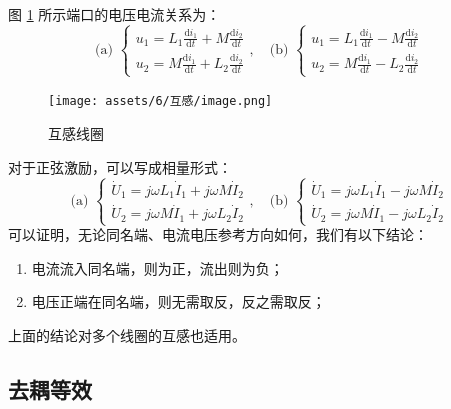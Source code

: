 \documentclass[UTF8]{report}
\theoremstyle{MyLineTheoremStyle} %
\theoremstyle{MyBlockTheoremStyle} %
\theoremstyle{MySubsubsectionStyle} %
\begin{document}
图 \ref{互感线圈} 所示端口的电压电流关系为：
\begin{equation}
\text{(a)\ } 
\begin{cases}
u_1 = L_1 \frac{\mathrm{d} i_1}{\mathrm{d} t} + M \frac{\mathrm{d} i_2}{\mathrm{d} t} \\
u_2 = M \frac{\mathrm{d} i_1}{\mathrm{d} t} + L_2 \frac{\mathrm{d} i_2}{\mathrm{d} t}
\end{cases}
,\quad 
\text{(b)\ }
\begin{cases}
u_1 = L_1 \frac{\mathrm{d} i_1}{\mathrm{d} t} - M \frac{\mathrm{d} i_2}{\mathrm{d} t} \\
u_2 = M \frac{\mathrm{d} i_1}{\mathrm{d} t} - L_2 \frac{\mathrm{d} i_2}{\mathrm{d} t}
\end{cases}
\end{equation}
\begin{figure}[H]\centering
    \texttt{[image: assets/6/互感/image.png]}
    \caption{互感线圈}
    \label{互感线圈}
\end{figure}
对于正弦激励，可以写成相量形式：
\begin{equation}
\text{(a)\ }
\begin{cases}
\dot{U}_1 = j \omega L_1 \dot{I}_1 + j \omega M \dot{I}_2 \\
\dot{U}_2 = j \omega M \dot{I}_1 + j \omega L_2 \dot{I}_2
\end{cases}
,\quad
\text{(b)\ }
\begin{cases}
\dot{U}_1 = j \omega L_1 \dot{I}_1 - j \omega M \dot{I}_2 \\
\dot{U}_2 = j \omega M \dot{I}_1 - j \omega L_2 \dot{I}_2
\end{cases}
\end{equation}
可以证明，无论同名端、电流电压参考方向如何，我们有以下结论：
\begin{enumerate}
\item 电流流入同名端，则为正，流出则为负；
\item 电压正端在同名端，则无需取反，反之需取反；
\end{enumerate}
上面的结论对多个线圈的互感也适用。

\subsection{去耦等效}
\end{document}
